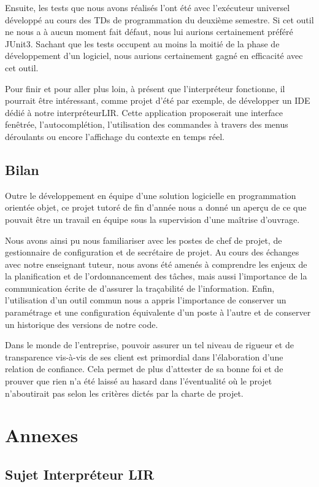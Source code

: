 \documentclass[12pt,a4paper,titlepage,openany, oneside]{report}
\begin{document}
        Ensuite, les tests que nous avons réalisés l'ont été avec l'exécuteur universel
        développé au cours des TDs de programmation du deuxième semestre. Si cet outil
        ne nous a à aucun moment fait défaut, nous lui aurions certainement préféré JUnit3.
        Sachant que les tests occupent au moins la moitié de la phase de développement d'un
        logiciel, nous aurions certainement gagné en efficacité avec cet outil.

        Pour finir et pour aller plus loin, à présent que l'interpréteur fonctionne, il
        pourrait être intéressant, comme projet d'été par exemple, de développer un
        IDE dédié à notre interpréteurLIR. Cette application proposerait une interface
        fenêtrée, l'autocomplétion, l'utilisation des commandes à travers des
        menus déroulants ou encore l'affichage du contexte en temps réel.


    \chapter{Bilan}
        \large
        Outre le développement en équipe d'une solution logicielle en programmation
        orientée objet, ce projet tutoré de fin d'année nous a donné un aperçu de ce que
        pouvait être un travail en équipe sous la supervision d'une maîtrise d'ouvrage.

        Nous avons ainsi pu nous familiariser avec les postes de chef de projet, de
        gestionnaire de configuration et de secrétaire de projet. Au cours des échanges
        avec notre enseignant tuteur, nous avons été amenés à comprendre les enjeux
        de la planification et de l'ordonnancement des tâches, mais aussi l'importance de
        la communication écrite de d'assurer la traçabilité de l'information. Enfin,
        l'utilisation d'un outil commun nous a appris l'importance de conserver un
        paramétrage et une configuration équivalente d'un poste à l'autre et de conserver
        un historique des versions de notre code.

        Dans le monde de l'entreprise, pouvoir assurer un tel niveau de rigueur et de
        transparence vis-à-vis de ses client est primordial dans l'élaboration d'une
        relation de confiance. Cela permet de plus d'attester de sa bonne foi et de
        prouver que rien n'a été laissé au hasard dans l'éventualité où le projet
        n'aboutirait pas selon les critères dictés par la charte de projet.

        \normalsize
    \part{Annexes}

    \appendix
    \chapter{Sujet Interpréteur LIR}

    
    
\end{document}
